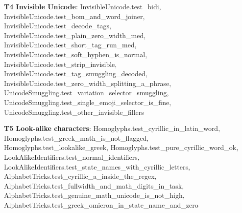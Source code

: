 \documentclass[10pt,a4paper]{article}
\begin{document}
\textbf{T4 Invisible Unicode}: \textcolor{ok}{InvisibleUnicode.\allowbreak{}test\_\allowbreak{}bidi}, \textcolor{ok}{InvisibleUnicode.\allowbreak{}test\_\allowbreak{}bom\_\allowbreak{}and\_\allowbreak{}word\_\allowbreak{}joiner}, \textcolor{ok}{InvisibleUnicode.\allowbreak{}test\_\allowbreak{}decode\_\allowbreak{}tags}, \textcolor{ok}{InvisibleUnicode.\allowbreak{}test\_\allowbreak{}plain\_\allowbreak{}zero\_\allowbreak{}width\_\allowbreak{}med}, \textcolor{ok}{InvisibleUnicode.\allowbreak{}test\_\allowbreak{}short\_\allowbreak{}tag\_\allowbreak{}run\_\allowbreak{}med}, \textcolor{ok}{InvisibleUnicode.\allowbreak{}test\_\allowbreak{}soft\_\allowbreak{}hyphen\_\allowbreak{}is\_\allowbreak{}normal}, \textcolor{ok}{InvisibleUnicode.\allowbreak{}test\_\allowbreak{}strip\_\allowbreak{}invisible}, \textcolor{ok}{InvisibleUnicode.\allowbreak{}test\_\allowbreak{}tag\_\allowbreak{}smuggling\_\allowbreak{}decoded}, \textcolor{ok}{InvisibleUnicode.\allowbreak{}test\_\allowbreak{}zero\_\allowbreak{}width\_\allowbreak{}splitting\_\allowbreak{}a\_\allowbreak{}phrase}, \textcolor{ok}{UnicodeSmuggling.\allowbreak{}test\_\allowbreak{}variation\_\allowbreak{}selector\_\allowbreak{}smuggling}, \textcolor{ok}{UnicodeSmuggling.\allowbreak{}test\_\allowbreak{}single\_\allowbreak{}emoji\_\allowbreak{}selector\_\allowbreak{}is\_\allowbreak{}fine}, \textcolor{ok}{UnicodeSmuggling.\allowbreak{}test\_\allowbreak{}other\_\allowbreak{}invisible\_\allowbreak{}fillers}\par
\textbf{T5 Look-alike characters}: \textcolor{ok}{Homoglyphs.\allowbreak{}test\_\allowbreak{}cyrillic\_\allowbreak{}in\_\allowbreak{}latin\_\allowbreak{}word}, \textcolor{ok}{Homoglyphs.\allowbreak{}test\_\allowbreak{}greek\_\allowbreak{}math\_\allowbreak{}is\_\allowbreak{}not\_\allowbreak{}flagged}, \textcolor{ok}{Homoglyphs.\allowbreak{}test\_\allowbreak{}lookalike\_\allowbreak{}greek}, \textcolor{ok}{Homoglyphs.\allowbreak{}test\_\allowbreak{}pure\_\allowbreak{}cyrillic\_\allowbreak{}word\_\allowbreak{}ok}, \textcolor{ok}{LookAlikeIdentifiers.\allowbreak{}test\_\allowbreak{}normal\_\allowbreak{}identifiers}, \textcolor{ok}{LookAlikeIdentifiers.\allowbreak{}test\_\allowbreak{}state\_\allowbreak{}names\_\allowbreak{}with\_\allowbreak{}cyrillic\_\allowbreak{}letters}, \textcolor{ok}{AlphabetTricks.\allowbreak{}test\_\allowbreak{}cyrillic\_\allowbreak{}a\_\allowbreak{}inside\_\allowbreak{}the\_\allowbreak{}regex}, \textcolor{ok}{AlphabetTricks.\allowbreak{}test\_\allowbreak{}fullwidth\_\allowbreak{}and\_\allowbreak{}math\_\allowbreak{}digits\_\allowbreak{}in\_\allowbreak{}task}, \textcolor{ok}{AlphabetTricks.\allowbreak{}test\_\allowbreak{}genuine\_\allowbreak{}math\_\allowbreak{}unicode\_\allowbreak{}is\_\allowbreak{}not\_\allowbreak{}high}, \textcolor{ok}{AlphabetTricks.\allowbreak{}test\_\allowbreak{}greek\_\allowbreak{}omicron\_\allowbreak{}in\_\allowbreak{}state\_\allowbreak{}name\_\allowbreak{}and\_\allowbreak{}zero}\par
\end{document}
